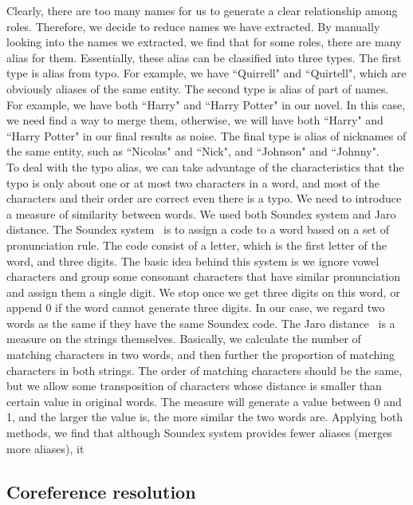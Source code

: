 \documentclass[11pt]{article}
\begin{document}
Clearly, there are too many names for us to generate a clear relationship among roles. Therefore, we decide to reduce names we have extracted. By manually looking into the names we extracted, we find that for some roles, there are many alias for them. Essentially, these alias can be classified into three types. The first type is alias from typo. For example, we have ``Quirrell" and ``Quirtell", which are obviously aliases of the same entity. The second type is alias of part of names. For example, we have both ``Harry" and ``Harry Potter" in our novel. In this case, we need find a way to merge them, otherwise, we will have both ``Harry" and ``Harry Potter" in our final results as noise. The final type is alias of nicknames of the same entity, such as ``Nicolas" and ``Nick", and ``Johnson" and ``Johnny". \\

To deal with the typo alias, we can take advantage of the characteristics that the typo is only about one or at most two characters in a word, and most of the characters and their order are correct even there is a typo. We need to introduce a measure of similarity between words. We used both Soundex system and Jaro distance. The Soundex system~\cite{Soundex} is to assign a code to a word based on a set of pronunciation rule. The code consist of a letter, which is the first letter of the word, and three digits. The basic idea behind this system is we ignore vowel characters and group some consonant characters that have similar pronunciation and assign them a single digit. We stop once we get three digits on this word, or append 0 if the word cannot generate three digits. In our case, we regard two words as the same if they have the same Soundex code. The Jaro distance~\cite{Jaro} is a measure on the strings themselves. Basically, we calculate the number of matching characters in two words, and then further the proportion of matching characters in both strings. The order of matching characters should be the same, but we allow some transposition of characters whose distance is smaller than certain value in original words. The measure will generate a value between 0 and 1, and the larger the value is, the more similar the two words are. Applying both methods, we find that although Soundex system provides fewer aliases (merges more aliases), it 


\subsection{Coreference resolution} %
\label{sect:pdf}
\end{document}
